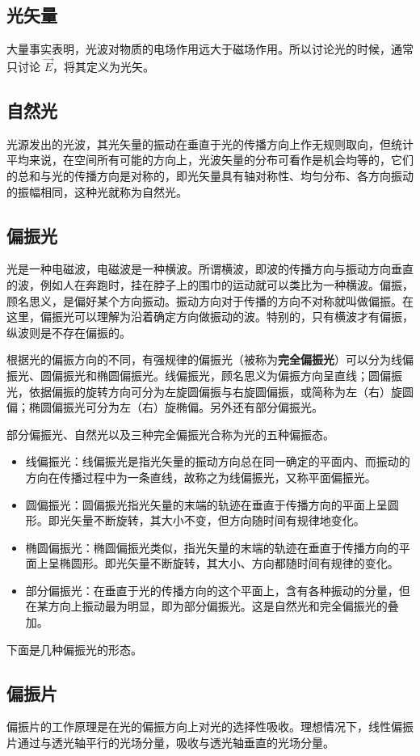 
\begin{issues}
\issueDraft
\end{issues}


\subsection{光矢量}
大量事实表明，光波对物质的电场作用远大于磁场作用。所以讨论光的时候，通常只讨论 $\vec{E}$，将其定义为光矢。

\subsection{自然光}
光源发出的光波，其光矢量的振动在垂直于光的传播方向上作无规则取向，但统计平均来说，在空间所有可能的方向上，光波矢量的分布可看作是机会均等的，它们的总和与光的传播方向是对称的，即光矢量具有轴对称性、均匀分布、各方向振动的振幅相同，这种光就称为自然光。

\subsection{偏振光}

光是一种电磁波，电磁波是一种横波。所谓横波，即波的传播方向与振动方向垂直的波，例如人在奔跑时，挂在脖子上的围巾的运动就可以类比为一种横波。偏振，顾名思义，是偏好某个方向振动。振动方向对于传播的方向不对称就叫做偏振。在这里，偏振光可以理解为沿着确定方向做振动的波。特别的，只有横波才有偏振，纵波则是不存在偏振的。

根据光的偏振方向的不同，有强规律的偏振光（被称为\textbf{完全偏振光}）可以分为线偏振光、圆偏振光和椭圆偏振光。线偏振光，顾名思义为偏振方向呈直线；圆偏振光，依据偏振的旋转方向可分为左旋圆偏振与右旋圆偏振，或简称为左（右）旋圆偏；椭圆偏振光可分为左（右）旋椭偏。另外还有部分偏振光。

部分偏振光、自然光以及三种完全偏振光合称为光的五种偏振态。

\begin{itemize}
\item 线偏振光：线偏振光是指光矢量的振动方向总在同一确定的平面内、而振动的方向在传播过程中为一条直线，故称之为线偏振光，又称平面偏振光。
\item 圆偏振光：圆偏振光指光矢量的末端的轨迹在垂直于传播方向的平面上呈圆形。即光矢量不断旋转，其大小不变，但方向随时间有规律地变化。
\item 椭圆偏振光：椭圆偏振光类似，指光矢量的末端的轨迹在垂直于传播方向的平面上呈椭圆形。即光矢量不断旋转，其大小、方向都随时间有规律的变化。
\item 部分偏振光：在垂直于光的传播方向的这个平面上，含有各种振动的分量，但在某方向上振动最为明显，即为部分偏振光。这是自然光和完全偏振光的叠加。
\end{itemize}


下面是几种偏振光的形态。


\subsection{偏振片}
偏振片的工作原理是在光的偏振方向上对光的选择性吸收。理想情况下，线性偏振片通过与透光轴平行的光场分量，吸收与透光轴垂直的光场分量。

